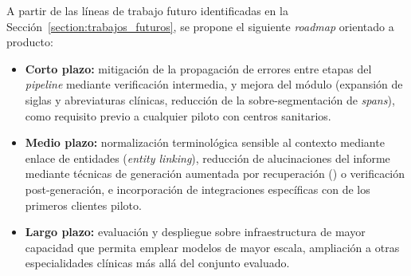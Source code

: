 A partir de las líneas de trabajo futuro identificadas en la
Sección~\ref{section:trabajos_futuros}, se propone el siguiente \textit{roadmap} orientado a producto:

\begin{itemize}
    \item \textbf{Corto plazo:} mitigación de la propagación de errores entre etapas del
    \textit{pipeline} mediante verificación intermedia, y mejora del módulo  (expansión
    de siglas y abreviaturas clínicas, reducción de la sobre-segmentación de \textit{spans}), como
    requisito previo a cualquier piloto con centros sanitarios.
    \item \textbf{Medio plazo:} normalización terminológica sensible al contexto mediante enlace de
    entidades (\textit{entity linking}), reducción de alucinaciones del informe 
    mediante técnicas de generación aumentada por recuperación () o verificación
    post-generación, e incorporación de integraciones  específicas con 
    de los primeros clientes piloto.
    \item \textbf{Largo plazo:} evaluación y despliegue sobre infraestructura de mayor capacidad que
    permita emplear modelos  de mayor escala, ampliación a otras especialidades
    clínicas más allá del conjunto evaluado.
\end{itemize}



